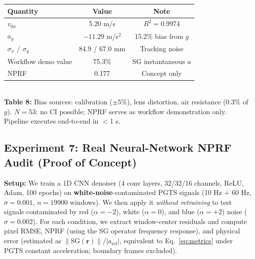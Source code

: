 \documentclass[9pt,twocolumn]{article}
\theoremstyle{remark}
\theoremstyle{definition}
\begin{document}
\begin{center}
    \scriptsize\setlength{\tabcolsep}{3.0pt}
    \begin{tabular}{lcc}
        \toprule
        \textbf{Quantity} & \textbf{Value} & \textbf{Note} \\
        \midrule
        $v_{0x}$ & 5.20 m/s & $R^2=0.9974$ \\
        $a_y$ & $-11.29$ m/s$^2$ & 15.2\% bias from $g$ \\
        $\sigma_x$ / $\sigma_y$ & 84.9 / 67.0 mm & Tracking noise \\
        Workflow demo value & 75.3\% & SG instantaneous $a$ \\
        NPRF & 0.177 & Concept only \\
        \bottomrule
    \end{tabular}
    \\[0.1pt]
    {\scriptsize \textbf{Table 8:} Bias sources: calibration ($\pm5\%$), lens distortion, air resistance (0.3\% of $g$). $N=53$: no CI possible; NPRF serves as workflow demonstration only. Pipeline executes end-to-end in $<$1 s.}
\end{center}

\subsection{Experiment 7: Real Neural-Network NPRF Audit (Proof of Concept)}

\textbf{Setup:} We train a 1D CNN denoiser (4 conv layers, 32/32/16 channels, ReLU, Adam, 100 epochs) on \textbf{white-noise}-contaminated PGTS signals (10 Hz + 60 Hz, $\sigma=0.001$, $n=19900$ windows). We then apply it \textit{without retraining} to test signals contaminated by red ($\alpha=-2$), white ($\alpha=0$), and blue ($\alpha=+2$) noise ($\sigma=0.002$). For each condition, we extract window-center residuals and compute pixel RMSE, NPRF (using the SG operator frequency response), and physical error (estimated as $\|\text{SG}(\mathbf{r})\|/|a_{\text{ref}}|$, equivalent to Eq.~\eqref{eq:metrics} under PGTS constant acceleration; boundary frames excluded).
\end{document}
